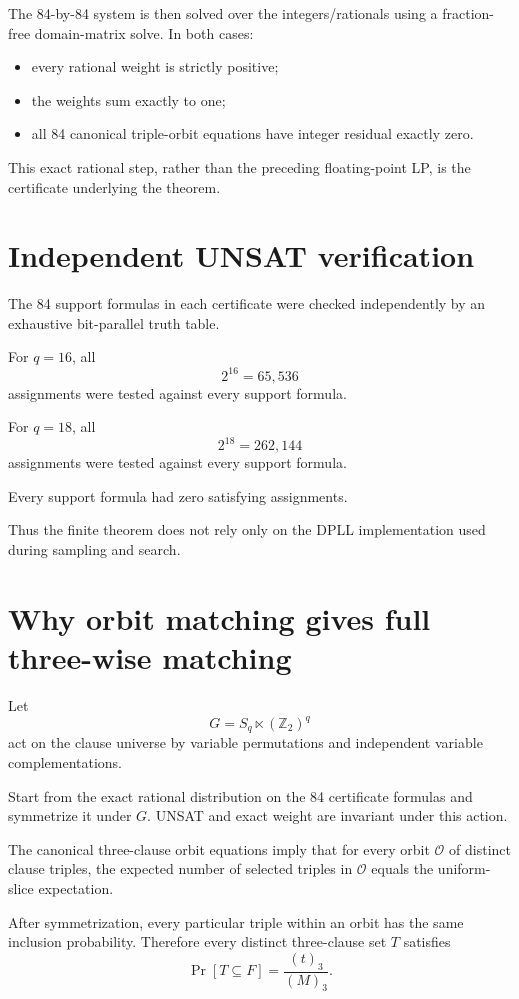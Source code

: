\documentclass[11pt]{article}
\begin{document}
The 84-by-84 system is then solved over the integers/rationals using a
fraction-free domain-matrix solve.  In both cases:

\begin{itemize}
\item every rational weight is strictly positive;
\item the weights sum exactly to one;
\item all 84 canonical triple-orbit equations have integer residual exactly
zero.
\end{itemize}

This exact rational step, rather than the preceding floating-point LP, is the
certificate underlying the theorem.

\section{Independent UNSAT verification}

The 84 support formulas in each certificate were checked independently by an
exhaustive bit-parallel truth table.

For \(q=16\), all
\[
2^{16}=65{,}536
\]
assignments were tested against every support formula.

For \(q=18\), all
\[
2^{18}=262{,}144
\]
assignments were tested against every support formula.

Every support formula had zero satisfying assignments.

Thus the finite theorem does not rely only on the DPLL implementation used
during sampling and search.

\section{Why orbit matching gives full three-wise matching}

Let
\[
G=S_q\ltimes(\mathbb Z_2)^q
\]
act on the clause universe by variable permutations and independent variable
complementations.

Start from the exact rational distribution on the 84 certificate formulas and
symmetrize it under \(G\).  UNSAT and exact weight are invariant under this
action.

The canonical three-clause orbit equations imply that for every orbit
\(\mathcal O\) of distinct clause triples, the expected number of selected
triples in \(\mathcal O\) equals the uniform-slice expectation.

After symmetrization, every particular triple within an orbit has the same
inclusion probability.  Therefore every distinct three-clause set \(T\)
satisfies
\[
\Pr[T\subseteq F]
=
\frac{(t)_3}{(M)_3}.
\tag{1}
\]
\end{document}
